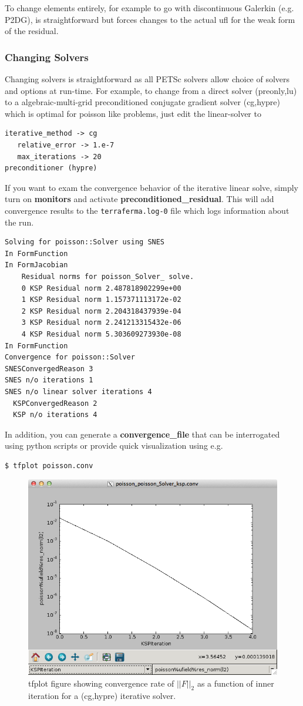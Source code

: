 To change elements entirely, for example to go with discontinuous
Galerkin (e.g. P2DG), is straightforward but forces changes to the
actual ufl for the weak form of the residual.

\subsubsection{Changing Solvers}
\label{sec:changing-solvers}

Changing solvers is straightforward as all PETSc solvers
allow choice of solvers and options at run-time.  For example, to
change from a direct solver (preonly,lu) to a algebraic-multi-grid
preconditioned conjugate gradient solver (cg,hypre) which is optimal
for poisson like problems, just edit the linear-solver to
\begin{lstlisting}[style=Bash]
iterative_method -> cg
   relative_error -> 1.e-7
   max_iterations -> 20
preconditioner (hypre)
\end{lstlisting}
If you want to exam the convergence behavior of the iterative linear
solve, simply turn on \textbf{monitors} and activate
\textbf{preconditioned\_residual}.  This will add convergence results
to the \texttt{terraferma.log-0} file which logs information about the run.
\begin{lstlisting}[style=Bash]
Solving for poisson::Solver using SNES
In FormFunction
In FormJacobian
    Residual norms for poisson_Solver_ solve.
    0 KSP Residual norm 2.487818902299e+00 
    1 KSP Residual norm 1.157371113172e-02 
    2 KSP Residual norm 2.204318437939e-04 
    3 KSP Residual norm 2.241213315432e-06 
    4 KSP Residual norm 5.303609273930e-08 
In FormFunction
Convergence for poisson::Solver
SNESConvergedReason 3
SNES n/o iterations 1
SNES n/o linear solver iterations 4
  KSPConvergedReason 2
  KSP n/o iterations 4
\end{lstlisting}
In addition, you can generate a \textbf{convergence\_file} that can be
interrogated using python scripts or provide quick visualization using
e.g.
\begin{lstlisting}[style=Bash]
$ tfplot poisson.conv
\end{lstlisting} %
\begin{figure}[ht!]
  \centering
  \includegraphics[width=.7\textwidth]{figures/screendumps/tfplot_cg-hypre-residuals.png}
  \caption{tfplot figure showing convergence rate of $||F||_2$ as a function of inner iteration for a (cg,hypre) iterative solver.}
  \label{fig:tfplot-convergence-poisson}
\end{figure}

